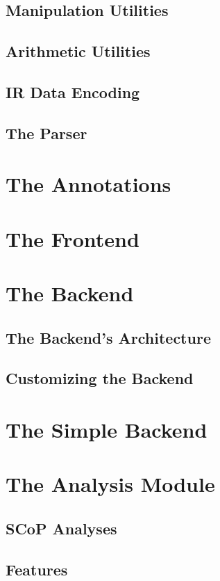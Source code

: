 \subsection{Manipulation Utilities}
\subsection{Arithmetic Utilities}
\subsection{IR Data Encoding}
\subsection{The Parser}

\section{The Annotations}

\section{The Frontend}

\section{The Backend}
\subsection{The Backend's Architecture}
\subsection{Customizing the Backend}

\section{The Simple Backend}

\section{The Analysis Module}
\subsection{SCoP Analyses}
\subsection{Features}

